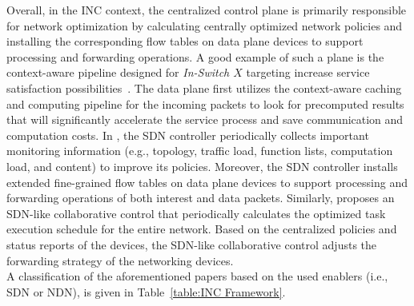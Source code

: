 Overall, in the INC context, the centralized control plane is primarily responsible for network optimization by calculating centrally optimized network policies and installing the corresponding flow tables on data plane devices to support processing and forwarding operations. A good example of such a plane is the context-aware pipeline designed for \textit{In-Switch $X$} targeting increase service satisfaction possibilities~\cite{li2021advancing}. The data plane first utilizes the context-aware caching and computing pipeline for the incoming packets to look for precomputed results that will significantly accelerate the service process and save communication and computation costs. In \cite{li2021advancing}, the SDN controller periodically collects important monitoring information (e.g., topology, traffic load, function lists, computation load, and content) to improve its policies. Moreover, the SDN controller installs extended fine-grained flow tables on data plane devices to support processing and forwarding operations of both interest and data packets.
Similarly, \cite{9350853} proposes an SDN-like collaborative control that periodically calculates the optimized task execution schedule for the entire network. Based on the centralized policies and status reports of the devices, the SDN-like collaborative control adjusts the forwarding strategy of the networking devices.\\
A classification of the aforementioned papers based on the used enablers (i.e., SDN or NDN), is given in Table~\ref{table:INC Framework}.

